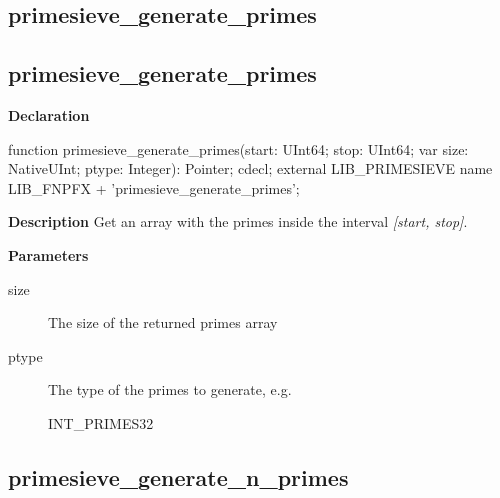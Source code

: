 \documentclass{report}
\newif\ifpdf
\begin{document}
\subsection*{\large{\textbf{primesieve{\_}generate{\_}primes}}\normalsize\hspace{1ex}\hrulefill}
\else
\subsection*{primesieve{\_}generate{\_}primes}
\fi
\label{primesieve-primesieve_generate_primes}
\begin{list}{}{
\setlength{\itemindent}{0cm}
\setlength{\listparindent}{0cm}
\setlength{\leftmargin}{\evensidemargin}
\addtolength{\leftmargin}{\tmplength}
\settowidth{\labelsep}{X}
\addtolength{\leftmargin}{\labelsep}
\setlength{\labelwidth}{\tmplength}
}
\item[\textbf{Declaration}\hfill]
\ifpdf
\begin{flushleft}
\fi
\begin{ttfamily}
function primesieve{\_}generate{\_}primes(start: UInt64; stop: UInt64; var size: NativeUInt; ptype: Integer): Pointer; cdecl; external LIB{\_}PRIMESIEVE name LIB{\_}FNPFX + 'primesieve{\_}generate{\_}primes';\end{ttfamily}

\ifpdf
\end{flushleft}
\fi

\par
\item[\textbf{Description}]
Get an array with the primes inside the interval \textit{[start, stop]}.

 \par
\item[\textbf{Parameters}]
\begin{description}
\item[size] The size of the returned primes array
\item[ptype] The type of the primes to generate, e.g. \begin{ttfamily}INT{\_}PRIMES32\end{ttfamily}
\end{description}


\end{list}
\ifpdf
\subsection*{\large{\textbf{primesieve{\_}generate{\_}n{\_}primes}}\normalsize\hspace{1ex}\hrulefill}
\else
\end{document}
